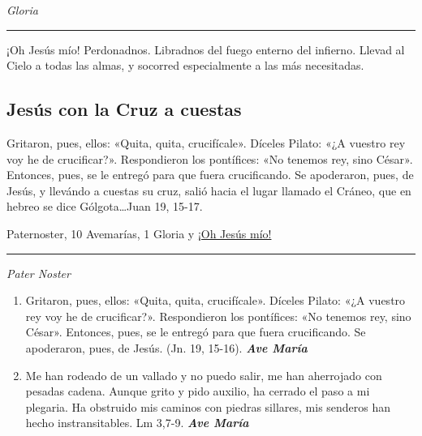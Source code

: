 \documentclass[a4paper,11pt, oneside]{report}
\begin{document}
{{\begin{enumerate}
      \end{enumerate}

      \indent\textit{Gloria} \par      

      \begin{center}\rule{1\linewidth}{\linethickness}\end{center}
      
      \medskip
      \hypertarget{finalCoronacion}{¡Oh Jesús mío! Perdonadnos. Libradnos del fuego enterno del infierno. Llevad al Cielo a todas las almas, y socorred especialmente a las más 
      necesitadas.}
    }

  \subsection*{Jesús con la Cruz a cuestas}
    {
      Gritaron, pues, ellos: «Quita, quita, crucifícale». Díceles Pilato: «¿A vuestro rey voy he de crucificar?». Respondieron los pontífices: «No tenemos rey,
      sino César». Entonces, pues, se le entregó para que fuera crucificando. Se apoderaron, pues, de Jesús, y llevándo a cuestas su cruz, salió hacia el lugar
      llamado el Cráneo, que en hebreo se dice Gólgota\ldots Juan 19, 15-17.

       Paternoster, 10 Avemarías, 1 Gloria y \hyperlink{finalCruz}{¡Oh Jesús mío!}

      \begin{center}\rule{1\linewidth}{\linethickness}\end{center}

      \medskip
      \textit{Pater Noster}

      \begin{enumerate}
        
        \item Gritaron, pues, ellos: «Quita, quita, crucifícale». Díceles Pilato: «¿A vuestro rey voy he de crucificar?». Respondieron los pontífices: «No tenemos rey,
        sino César». Entonces, pues, se le entregó para que fuera crucificando. Se apoderaron, pues, de Jesús. (Jn. 19, 15-16). \textbf{\textit{Ave María}}

        \item Me han rodeado de un vallado y no puedo salir, me han aherrojado con pesadas cadena. Aunque grito y pido auxilio, ha cerrado el paso
        a mi plegaria. Ha obstruido mis caminos con piedras sillares, mis senderos han hecho instransitables. Lm 3,7-9. \textbf{\textit{Ave María}}


\end{enumerate}}}
\end{document}
